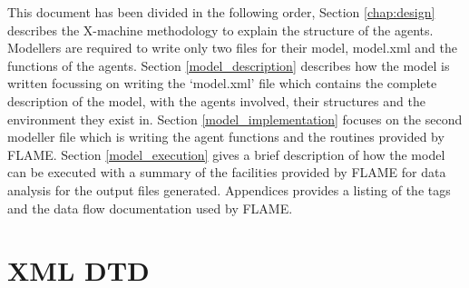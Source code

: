 \documentclass[12pt,a4paper]{article}
\begin{document}
This document has been divided in the following order, Section
\ref{chap:design} describes the X-machine methodology to explain the
structure of the agents. Modellers are required to write only two
files for their model, model.xml and the functions of the agents.
Section \ref{model_description} describes how the model is written
focussing on writing the `model.xml' file which contains the
complete description of the model, with the agents involved, their
structures and the environment they exist in. Section
\ref{model_implementation} focuses on the second modeller file which
is writing the agent functions and the routines provided by FLAME.
Section \ref{model_execution} gives a brief description of how the
model can be executed with a summary of the facilities provided by
FLAME for data analysis for the output files generated. Appendices
provides a listing of the tags and the data flow documentation used
by FLAME.






\appendix

\section{XML DTD}                       %
\label{cha_xmldtd}

\small{{\tt }}


%
%
\end{document}
